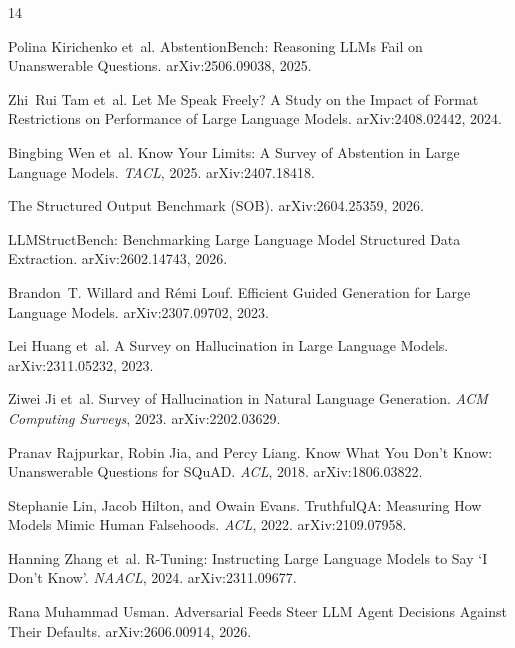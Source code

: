 \documentclass{article}
\begin{document}

\begin{thebibliography}{14}

Polina Kirichenko et~al.
\newblock AbstentionBench: Reasoning LLMs Fail on Unanswerable Questions.
\newblock arXiv:2506.09038, 2025.

Zhi~Rui Tam et~al.
\newblock Let Me Speak Freely? A Study on the Impact of Format Restrictions on Performance of Large Language Models.
\newblock arXiv:2408.02442, 2024.

Bingbing Wen et~al.
\newblock Know Your Limits: A Survey of Abstention in Large Language Models.
\newblock \emph{TACL}, 2025. arXiv:2407.18418.

The Structured Output Benchmark (SOB).
\newblock arXiv:2604.25359, 2026.

LLMStructBench: Benchmarking Large Language Model Structured Data Extraction.
\newblock arXiv:2602.14743, 2026.

Brandon~T. Willard and R{\'e}mi Louf.
\newblock Efficient Guided Generation for Large Language Models.
\newblock arXiv:2307.09702, 2023.

Lei Huang et~al.
\newblock A Survey on Hallucination in Large Language Models.
\newblock arXiv:2311.05232, 2023.

Ziwei Ji et~al.
\newblock Survey of Hallucination in Natural Language Generation.
\newblock \emph{ACM Computing Surveys}, 2023. arXiv:2202.03629.

Pranav Rajpurkar, Robin Jia, and Percy Liang.
\newblock Know What You Don't Know: Unanswerable Questions for SQuAD.
\newblock \emph{ACL}, 2018. arXiv:1806.03822.

Stephanie Lin, Jacob Hilton, and Owain Evans.
\newblock TruthfulQA: Measuring How Models Mimic Human Falsehoods.
\newblock \emph{ACL}, 2022. arXiv:2109.07958.

Hanning Zhang et~al.
\newblock R-Tuning: Instructing Large Language Models to Say `I Don't Know'.
\newblock \emph{NAACL}, 2024. arXiv:2311.09677.

Rana Muhammad Usman.
\newblock Adversarial Feeds Steer LLM Agent Decisions Against Their Defaults.
\newblock arXiv:2606.00914, 2026.

\end{thebibliography}
\end{document}
